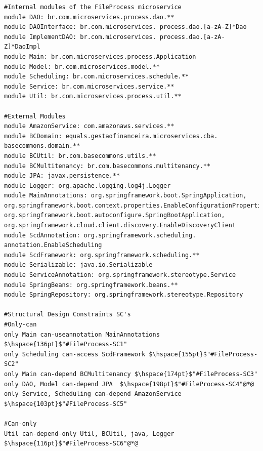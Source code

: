 \documentclass[12pt]{article}
\begin{document}
\begin{lstlisting}[style=colorido, caption={\textcolor{blue}{FileProcess microservice's architectural design specification.}},label={list:especArquiteturalFileProccess}
]
#Internal modules of the FileProcess microservice
module DAO: br.com.microservices.process.dao.**
module DAOInterface: br.com.microservices. process.dao.[a-zA-Z]*Dao
module ImplementDAO: br.com.microservices. process.dao.[a-zA-Z]*DaoImpl
module Main: br.com.microservices.process.Application
module Model: br.com.microservices.model.**
module Scheduling: br.com.microservices.schedule.**
module Service: br.com.microservices.service.**
module Util: br.com.microservices.process.util.**

#External Modules
module AmazonService: com.amazonaws.services.**
module BCDomain: equals.gestaofinanceira.microservices.cba. basecommons.domain.**
module BCUtil: br.com.basecommons.utils.**
module BCMultitenancy: br.com.basecommons.multitenancy.**
module JPA: javax.persistence.**
module Logger: org.apache.logging.log4j.Logger
module MainAnnotations: org.springframework.boot.SpringApplication, org.springframework.boot.context.properties.EnableConfigurationProperties, org.springframework.boot.autoconfigure.SpringBootApplication, org.springframework.cloud.client.discovery.EnableDiscoveryClient
module ScdAnnotation: org.springframework.scheduling. annotation.EnableScheduling
module ScdFramework: org.springframework.scheduling.**
module Serializable: java.io.Serializable
module ServiceAnnotation: org.springframework.stereotype.Service
module SpringBeans: org.springframework.beans.**
module SpringRepository: org.springframework.stereotype.Repository

#Structural Design Constraints SC's
#Only-can
only Main can-useannotation MainAnnotations	$\hspace{136pt}$"#FileProcess-SC1"
only Scheduling can-access ScdFramework $\hspace{155pt}$"#FileProcess-SC2"
only Main can-depend BCMultitenancy $\hspace{174pt}$"#FileProcess-SC3"
only DAO, Model can-depend JPA	$\hspace{198pt}$"#FileProcess-SC4"@*@
only Service, Scheduling can-depend AmazonService 	$\hspace{103pt}$"#FileProcess-SC5"

#Can-only
Util can-depend-only Util, BCUtil, java, Logger $\hspace{116pt}$"#FileProcess-SC6"@*@
    

\end{lstlisting}
\end{document}
